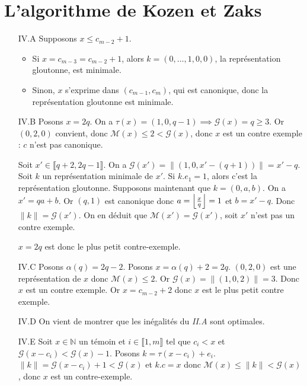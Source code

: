 \documentclass{article}
\newcommand{\N}{\mathbb{N}}
\newcommand{\M}{\mathscr{M}}
\newcommand{\T}{\tau}
\newcommand{\G}{\mathscr{G}}
\newcommand{\norm}[1]{\|#1\|}
\newcommand{\scal}{.}
\newcommand{\seg}[2]{\llbracket #1, #2 \rrbracket}
\DeclarePairedDelimiter{\floor}{\lfloor}{\rfloor}
\begin{document}
\section{L'algorithme de Kozen et Zaks}
\begin{enumerate}
    \item[IV.A] Supposons $x\leq c_{m-2} + 1$.\begin{itemize}
            \item Si $x = c_{m-3} = c_{m-2} + 1$, alors $k = (0,\ldots,1, 0, 0)$, la représentation gloutonne, est minimale.
            \item Sinon, $x$ s'exprime dans $(c_{m-1}, c_m)$, qui est canonique, donc la représentation gloutonne est minimale.
        \end{itemize}

    \item[IV.B] Posons $x = 2q$. On a $\T(x) = (1, 0, q-1) \implies \G(x) = q \geq 3$. Or $(0, 2, 0)$ convient, donc $\M(x) \leq 2 < \G(x)$, donc $x$ est un contre exemple : $c$ n'est pas canonique.

        Soit $x'\in\seg{q+2}{2q-1}$. On a $\G(x') = \norm{(1,0,x' - (q+1))} = x' - q$. Soit $k$ un représentation minimale de $x'$. Si $k\scal e_1 = 1$, alors c'est la représentation gloutonne. Supposons maintenant que $k=(0,a,b)$. On a $x' = qa + b$. Or $(q,1)$ est canonique donc $a = \floor*{\frac{x}{q}} = 1$ et $b = x' - q$. Donc $\norm{k} = \G(x')$. On en déduit que $\M(x') = \G(x')$, soit $x'$ n'est pas un contre exemple.

        $x = 2q$ est donc le plus petit contre-exemple.

    \item[IV.C] Posons $\alpha(q) = 2q - 2$. Posons $x = \alpha(q) + 2 = 2q$. $(0,2,0)$ est une représentation de $x$ donc $\M(x) \leq 2$. Or $\G(x) = \norm{(1,0,2)} = 3$. Donc $x$ est un contre exemple. Or $x = c_{m-2} + 2$ donc $x$ est le plus petit contre exemple.

    \item[IV.D] On vient de montrer que les inégalités du \emph{II.A} sont optimales.

    \item[IV.E] Soit $x\in\N$ un témoin et $i\in\seg{1}{m}$ tel que $c_i < x$ et $\G(x-c_i) < \G(x) - 1$. Posons $k = \T(x-c_i) + e_i$. $\norm{k} = \G(x-c_i) + 1 < \G(x)$ et $k\scal c = x$ donc $\M(x) \leq \norm{k} < \G(x)$, donc $x$ est un contre-exemple.



\end{enumerate}
\end{document}
